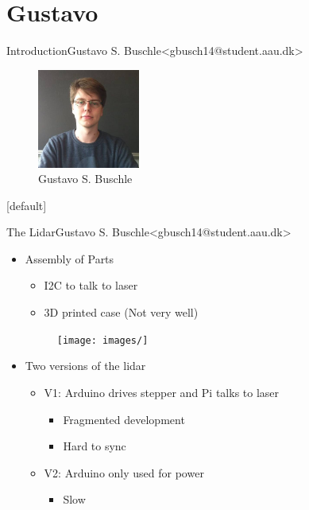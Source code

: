 \section{Gustavo}

\begin{frame}{Introduction}{Gustavo S. Buschle\newline<gbusch14@student.aau.dk>}
    \begin{figure}[h!]
        \includegraphics[width=0.3\textwidth]{images/gustavo.jpg}
        \caption{Gustavo S. Buschle}
        \centering
    \end{figure}
\end{frame}
[default]

\begin{frame}{The Lidar}{Gustavo S. Buschle\newline<gbusch14@student.aau.dk>}
    \begin{itemize}
        \item <1-> Assembly of Parts
            \begin{itemize}
                \item <2-> I2C to talk to laser
                \item <3-> 3D printed case (Not very well)
            \end{itemize}

        \begin{figure}[h!]
            \texttt{[image: images/]}
        \end{figure}
        
        
        \item <4-> Two versions of the lidar
        \begin{itemize}
            \item <5-> V1: Arduino drives stepper and Pi talks to laser
                \begin{itemize}
                    \item <6-> Fragmented development
                    \item <7-> Hard to sync
                \end{itemize}
            \item <8-> V2: Arduino only used for power 
                \begin{itemize}
                    \item <9-> Slow
                \end{itemize}
        \end{itemize}
    \end{itemize}
\end{frame}

